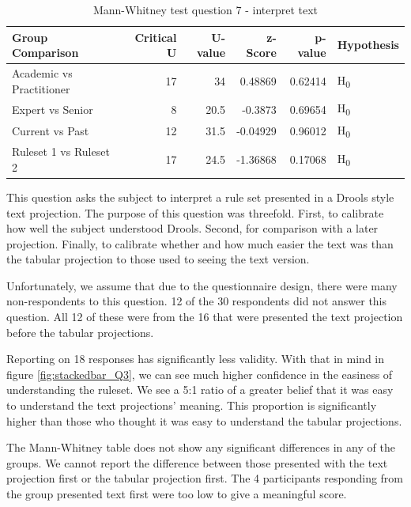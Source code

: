 \begin{table}
    \begin{center}
        \begin{tabular}{ |l ||r |r |r | r|l | } 
            \hline
            Group Comparison                 & Critical U & U-value & z-Score  & p-value & Hypothesis         \\
            \hline
            \hline
            Academic vs Practitioner         & 17         & 34      &  0.48869 & 0.62414 & H\textsubscript{0} \\ 
            \hline
            Expert vs Senior                 & 8          & 20.5    &  -0.3873 & 0.69654 & H\textsubscript{0} \\ 
            \hline
            Current vs Past                  & 12         & 31.5    &  -0.04929& 0.96012 & H\textsubscript{0} \\ 
            \hline
            Ruleset 1 vs Ruleset 2           & 17         & 24.5    &  -1.36868& 0.17068 & H\textsubscript{0} \\ 
            \hline
        \end{tabular}
    \end{center}
    \caption{Mann-Whitney test question 7 - interpret text}
    \label{table:mannwhitneyQ3}
\end{table}

This question asks the subject to interpret a rule set presented in a Drools style text projection.
The purpose of this question was threefold.
First, to calibrate how well the subject understood Drools.
Second, for comparison with a later projection.
Finally, to calibrate whether and how much easier the text was than the tabular projection to those used to seeing the text version.

Unfortunately, we assume that due to the questionnaire design, there were many non-respondents to this question. 
12 of the 30 respondents did not answer this question.
All 12 of these were from the 16 that were presented the text projection before the tabular projections.

Reporting on 18 responses has significantly less validity.
With that in mind in figure \ref{fig:stackedbar_Q3}, we can see much higher confidence in the easiness of understanding the ruleset.
We see a 5:1 ratio of a greater belief that it was easy to understand the text projections' meaning.
This proportion is significantly higher than those who thought it was easy to understand the tabular projections.

The Mann-Whitney table does not show any significant differences in any of the groups.
We cannot report the difference between those presented with the text projection first or the tabular projection first.
The 4 participants responding from the group presented text first were too low to give a meaningful score.

